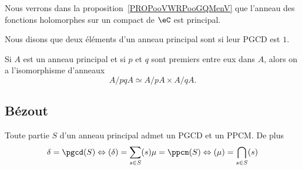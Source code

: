 \begin{example}
    Nous verrons dans la proposition~\ref{PROPooVWRPooGQMenV} que l'anneau des fonctions holomorphes sur un compact de \( \eC\) est principal.
\end{example}

\begin{definition}      \label{DEFooXSPFooPumQSy}
Nous disons que deux éléments d'un anneau principal sont  si leur PGCD est \( 1\).
\end{definition}

\begin{theorem}        \label{ThofPXwiM}
    Si \( A\) est un anneau principal et si \( p\) et \( q\) sont premiers entre eux dans \( A\), alors on a l'isomorphisme d'anneaux
    \begin{equation}
        A/pqA\simeq A/pA\times A/qA.
    \end{equation}
\end{theorem}

\subsection{Bézout}

\begin{theorem}
    Toute partie \( S\) d'un anneau principal admet un PGCD et un PPCM. De plus
    \begin{equation}
        \begin{aligned}[]
            \delta=\pgcd(S)\Leftrightarrow (\delta)=\sum_{s\in S}(s)
            \mu=\ppcm(S)\Leftrightarrow (\mu)=\bigcap_{s\in S}(s)
        \end{aligned}
    \end{equation}
\end{theorem}

